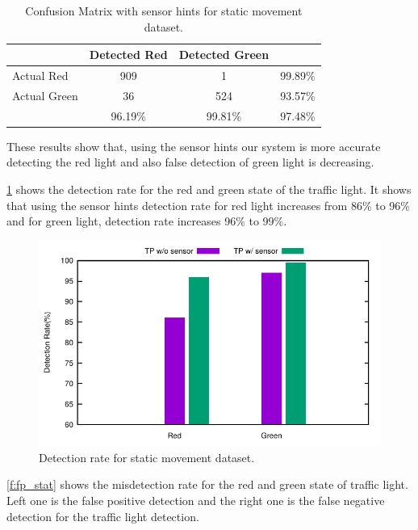 \begin{table}[h!]
  \centering
  \caption{Confusion Matrix with sensor hints for static movement dataset.}
  \label{t:con_crp}
  \begin{tabular}{  l | c | c | r }
   
     & Detected Red & Detected Green &  \\
    \hline
    Actual Red & 909 & 1 & 99.89\% \\
    \hline
    Actual Green & 36 & 524 & 93.57\% \\
    \hline
    & 96.19\% & 99.81\% & 97.48\% \\
    
  \end{tabular}
\end{table}

These results show that, using the sensor hints our system is more accurate detecting the red light and also false detection of green light is decreasing.

\ref{f:tp_stat} shows the detection rate for the red and green state of the traffic light.
It shows that using the sensor hints detection rate for red light increases from 86\% to 96\% and for green light, detection rate increases 96\% to 99\%.

\begin{figure}[h!]
\centering
\includegraphics[width=5.2in]{plots/bar_tp.pdf}
\caption{Detection rate for static movement dataset.}
\label{f:tp_stat}
\end{figure}

\ref{f:fp_stat} shows the misdetection rate for the red and green state of traffic light.
Left one is the false positive detection and the right one is the false negative detection for the traffic light detection.

